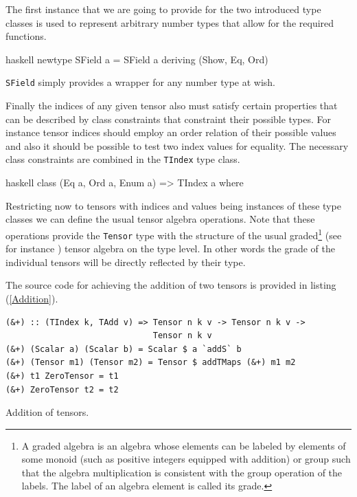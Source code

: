 \documentclass[a4paper,12pt, DIV=14, BCOR=5mm, twoside, headsepline, numbers=noenddot]{scrbook}
\begin{document}
The first instance that we are going to provide for the two introduced type classes is used to represent arbitrary number types that allow for the required functions. 

\begin{center}
\begin{cminted}{haskell}
newtype SField a = SField a deriving (Show, Eq, Ord)
\end{cminted} 
\end{center}

\texttt{SField} simply provides a wrapper for any number type at wish.

Finally the indices of any given tensor also must satisfy certain properties that can be described by class constraints that constraint their possible types. For instance tensor indices should employ an order relation of their possible values and also it should be possible to test two index values for equality. The necessary class constraints are combined in the \texttt{TIndex} type class.

\begin{center}
\begin{cminted}{haskell}
class (Eq a, Ord a, Enum a) => TIndex a where
\end{cminted} 
\end{center}



Restricting now to tensors with indices and values being instances of these type classes we can define the usual tensor algebra operations.
Note that these operations provide the \texttt{Tensor} type with the structure of the usual graded\footnote{A graded algebra is an algebra whose elements can be labeled by elements of some monoid (such as positive integers equipped with addition) or group such that the algebra multiplication is consistent with the group operation of the labels. The label of an algebra element is called its grade.} (see for instance \cite{bourbaki1998algebra}) tensor algebra on the type level. In other words the grade of the individual tensors will be directly reflected by their type.

The source code for achieving the addition of two tensors is provided in listing (\ref{Addition}).

\begin{listing}[hbt!]
\begin{verbatim}
(&+) :: (TIndex k, TAdd v) => Tensor n k v -> Tensor n k v ->
                              Tensor n k v
(&+) (Scalar a) (Scalar b) = Scalar $ a `addS` b
(&+) (Tensor m1) (Tensor m2) = Tensor $ addTMaps (&+) m1 m2
(&+) t1 ZeroTensor = t1
(&+) ZeroTensor t2 = t2
\end{verbatim} 
\caption{Addition of tensors.}\label{Addition}
\end{listing}
\end{document}
